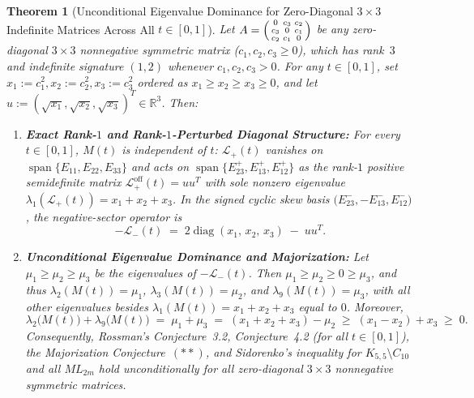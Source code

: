 \documentclass[11pt,a4paper]{article}
\theoremstyle{plain}
\newtheorem{theorem}{Theorem}[section]
\theoremstyle{definition}
\theoremstyle{remark}
\DeclareMathOperator{\diag}{diag}
\begin{document}
\begin{theorem}[Unconditional Eigenvalue Dominance for Zero-Diagonal $3 \times 3$ Indefinite Matrices Across All {$t \in [0,1]$}]\label{thm:zero_diag_3x3}
Let $A = \begin{psmallmatrix} 0 & c_3 & c_2 \\ c_3 & 0 & c_1 \\ c_2 & c_1 & 0 \end{psmallmatrix}$ be any zero-diagonal $3 \times 3$ nonnegative symmetric matrix ($c_1, c_2, c_3 \ge 0$), which has rank~$3$ and indefinite signature $(1,2)$ whenever $c_1, c_2, c_3 > 0$. For any $t \in [0,1]$, set $x_1 := c_1^2, x_2 := c_2^2, x_3 := c_3^2$ ordered as $x_1 \ge x_2 \ge x_3 \ge 0$, and let $u := (\sqrt{x_1}, \sqrt{x_2}, \sqrt{x_3})^T \in \mathbb{R}^3$. Then:
\begin{enumerate}[label=(\alph*)]
  \item \textbf{Exact Rank-$1$ and Rank-$1$-Perturbed Diagonal Structure:} For every $t \in [0,1]$, $M(t)$ is independent of $t$: $\mathcal{L}_+(t)$ vanishes on $\operatorname{span}\{E_{11}, E_{22}, E_{33}\}$ and acts on $\operatorname{span}\{E_{23}^+, E_{13}^+, E_{12}^+\}$ as the rank-$1$ positive semidefinite matrix $\mathcal{L}_+^{\mathrm{off}}(t) = u u^T$ with sole nonzero eigenvalue $\lambda_1(\mathcal{L}_+(t)) = x_1 + x_2 + x_3$. In the signed cyclic skew basis $\big(E_{23}^-, -E_{13}^-, E_{12}^-\big)$, the negative-sector operator is
  \begin{equation}\label{eq:zero_diag_Lminus}
    -\mathcal{L}_-(t) \;=\; 2\diag(x_1, \, x_2, \, x_3) \;-\; u u^T.
  \end{equation}
  \item \textbf{Unconditional Eigenvalue Dominance and Majorization:} Let $\mu_1 \ge \mu_2 \ge \mu_3$ be the eigenvalues of $-\mathcal{L}_-(t)$. Then $\mu_1 \ge \mu_2 \ge 0 \ge \mu_3$, and thus $\lambda_2(M(t)) = \mu_1$, $\lambda_3(M(t)) = \mu_2$, and $\lambda_9(M(t)) = \mu_3$, with all other eigenvalues besides $\lambda_1(M(t)) = x_1 + x_2 + x_3$ equal to $0$. Moreover,
  \begin{equation}\label{eq:zero_diag_gap}
    \boxed{\lambda_2\big(M(t)\big) + \lambda_9\big(M(t)\big) \;=\; \mu_1 + \mu_3 \;=\; (x_1 + x_2 + x_3) - \mu_2 \;\ge\; (x_1 - x_2) + x_3 \;\ge\; 0.}
  \end{equation}
  Consequently, Rossman's Conjecture~3.2, Conjecture~4.2 (for all $t \in [0,1]$), the Majorization Conjecture~$(**)$, and Sidorenko's inequality for $K_{5,5} \setminus C_{10}$ and all $ML_{2m}$ hold unconditionally for all zero-diagonal $3 \times 3$ nonnegative symmetric matrices.
\end{enumerate}
\end{theorem}
\end{document}
